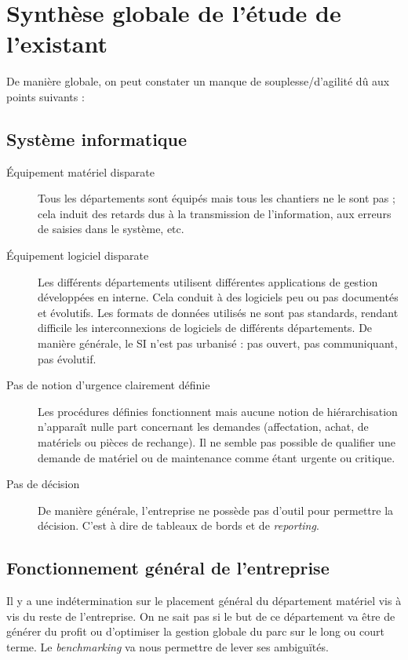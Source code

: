 \section{Synthèse globale de l'étude de l'existant}

De manière globale, on peut constater un manque de souplesse/d'agilité dû
aux points suivants :

\subsection{Système informatique}

\begin{description}
\item[Équipement matériel disparate]\el
Tous les départements sont équipés mais tous les chantiers ne le sont pas ;
cela induit des retards dus à la transmission de l'information, aux erreurs
de saisies dans le système, etc.  

\item[Équipement logiciel disparate]\el
Les différents départements utilisent différentes applications de gestion
développées en interne. Cela conduit à des logiciels peu ou pas documentés
et évolutifs. Les formats de données utilisés ne sont pas standards,
rendant difficile les interconnexions de logiciels de différents
départements. De manière générale, le SI n'est pas urbanisé : pas ouvert,
pas communiquant, pas évolutif.

\item[Pas de notion d'urgence clairement définie]\el
Les procédures définies fonctionnent mais aucune notion de hiérarchisation
n'apparaît nulle part concernant les demandes (affectation, achat, de
matériels ou pièces de rechange).  Il ne semble pas possible de qualifier
une demande de matériel ou de maintenance comme étant urgente ou critique.

\item[Pas de décision]\el
De manière générale, l'entreprise ne possède pas d'outil pour permettre la 
décision. C'est à dire de tableaux de bords et de {\sl reporting}.

\end{description}

\subsection{Fonctionnement général de l'entreprise}

Il y a une indétermination sur le placement général du département matériel 
vis à vis du reste de l'entreprise. On ne sait pas si le but de ce département
va être de générer du profit ou d'optimiser la gestion globale du parc sur le long
ou court terme. Le {\sl benchmarking} va nous permettre de lever ses ambiguïtés.

